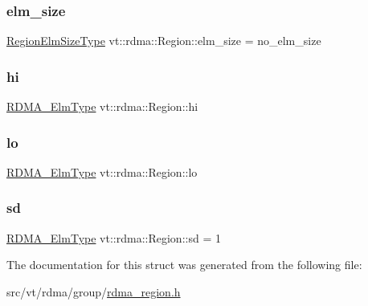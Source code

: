 \subsubsection{\texorpdfstring{elm\+\_\+size}{elm\_size}}
{\footnotesize\ttfamily \hyperlink{namespacevt_1_1rdma_ac07ef96e399913495fde1da0f83f684c}{Region\+Elm\+Size\+Type} vt\+::rdma\+::\+Region\+::elm\+\_\+size = no\+\_\+elm\+\_\+size}

\mbox{\label{structvt_1_1rdma_1_1_region_a59ead9e316796250e28c58574d3d256f}} 
\subsubsection{\texorpdfstring{hi}{hi}}
{\footnotesize\ttfamily \hyperlink{namespacevt_a2c2a902092b72056f70210c159f966f0}{R\+D\+M\+A\+\_\+\+Elm\+Type} vt\+::rdma\+::\+Region\+::hi}

\mbox{\label{structvt_1_1rdma_1_1_region_af2308f5160a4900ab6597d11fc2e51df}} 
\subsubsection{\texorpdfstring{lo}{lo}}
{\footnotesize\ttfamily \hyperlink{namespacevt_a2c2a902092b72056f70210c159f966f0}{R\+D\+M\+A\+\_\+\+Elm\+Type} vt\+::rdma\+::\+Region\+::lo}

\mbox{\label{structvt_1_1rdma_1_1_region_a9e6e05b4c6584c1a7b4c5b527f229f27}} 
\subsubsection{\texorpdfstring{sd}{sd}}
{\footnotesize\ttfamily \hyperlink{namespacevt_a2c2a902092b72056f70210c159f966f0}{R\+D\+M\+A\+\_\+\+Elm\+Type} vt\+::rdma\+::\+Region\+::sd = 1}



The documentation for this struct was generated from the following file\+:\begin{DoxyCompactItemize}
\item 
src/vt/rdma/group/\hyperlink{rdma__region_8h}{rdma\+\_\+region.\+h}\end{DoxyCompactItemize}
